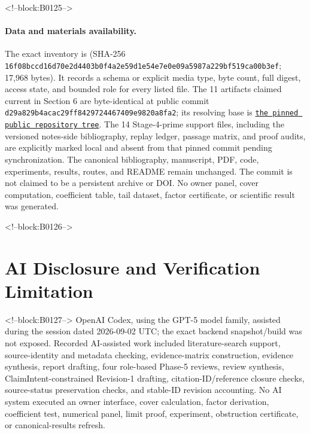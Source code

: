 \documentclass[11pt]{article}
\begin{document}
<!--block:B0125-->
\paragraph{Data and materials availability.}\begingroup\sloppy
The exact inventory is
 (SHA-256
\texttt{16f08bcc\allowbreak{}d16d70e2\allowbreak{}d4403b0f\allowbreak{}4a2e59d1\allowbreak{}e54e7e0e\allowbreak{}09a5987a\allowbreak{}229bf519\allowbreak{}ca00b3ef}; 17,968 bytes).  It records a schema or explicit media type,
byte count, full digest, access state, and bounded role for every listed file.
The 11 artifacts claimed current in Section 6 are byte-identical at public
commit \texttt{d29a829b\allowbreak{}4acac29f\allowbreak{}f8429724\allowbreak{}467409e9\allowbreak{}820a8fa2}; its resolving base is
\href{https://github.com/maris205/hilbert-polya-structure/tree/d29a829b4acac29ff8429724467409e9820a8fa2/flow_systems/papers/32-homology-cover-renormalization-uniformity}{\texttt{the pinned public repository tree}}.
The 14 Stage-4-prime support files, including the versioned notes-side
bibliography, replay ledger, passage matrix, and proof audits, are explicitly
marked local and absent from that pinned commit pending synchronization.  The
canonical bibliography, manuscript, PDF, code, experiments, results, routes,
and README remain unchanged.  The commit is not claimed to be a persistent
archive or DOI.  No owner panel, cover computation, coefficient table, tail
dataset, factor certificate, or scientific result was generated.
\par\endgroup

<!--block:B0126-->
\hypertarget{ai-disclosure-and-verification-limitation}{%
\section*{AI Disclosure and Verification
Limitation}\label{ai-disclosure-and-verification-limitation}}

<!--block:B0127-->
OpenAI Codex, using the GPT-5 model family, assisted during the session
dated 2026-09-02 UTC; the exact backend snapshot/build was not exposed.
Recorded AI-assisted work included literature-search support,
source-identity and metadata checking, evidence-matrix construction,
evidence synthesis, report drafting, four role-based Phase-5 reviews,
review synthesis, ClaimIntent-constrained Revision-1 drafting,
citation-ID/reference closure checks, source-status preservation checks,
and stable-ID revision accounting. No AI system executed an owner
interface, cover calculation, factor derivation, coefficient test,
numerical panel, limit proof, experiment, obstruction certificate, or
canonical-results refresh.
\end{document}
